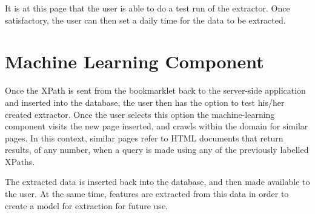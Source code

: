  It is at this page that the user is able to do a test run of the extractor. Once satisfactory,
 the user can then set a daily time for the data to be extracted. 

\section{Machine Learning Component}
Once the XPath is sent from the bookmarklet back to the server-side application and inserted
into the database, the user then has the option to test his/her created extractor. Once the
user selects this option the machine-learning component visits the new page inserted, and
crawls within the domain for similar pages. In this context, similar pages refer to HTML
documents that return results, of any number, when a query is made using any of the previously
labelled XPaths. 



	The extracted data is inserted back into the database, and then made available to the user.
At the same time, features are extracted from this data in order to create a model for
extraction for future use.
	
	
